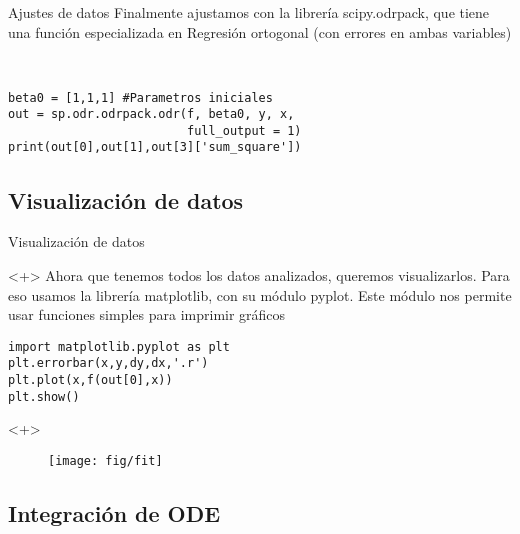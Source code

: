 \documentclass{beamer}
\begin{document}
\begin{frame}[fragile]{Ajustes de datos}
    Finalmente ajustamos con la librería scipy.odrpack, que tiene una función especializada en Regresión ortogonal (con errores en ambas variables)
    \begin{verbatim}


beta0 = [1,1,1] #Parametros iniciales
out = sp.odr.odrpack.odr(f, beta0, y, x, 
                         full_output = 1)
print(out[0],out[1],out[3]['sum_square'])
\end{verbatim}
   
\end{frame}


\subsection{Visualización de datos}

\begin{frame}[fragile]{Visualización de datos}
\begin{onlyenv}<+>
    Ahora que tenemos todos los datos analizados, queremos visualizarlos. Para eso usamos la librería matplotlib, con su módulo pyplot. Este módulo nos permite usar funciones simples para imprimir gráficos
\begin{verbatim}
import matplotlib.pyplot as plt
plt.errorbar(x,y,dy,dx,'.r')
plt.plot(x,f(out[0],x))
plt.show()
\end{verbatim}
\end{onlyenv}
\begin{onlyenv}<+>
  \begin{figure}
  \centering
  \texttt{[image: fig/fit]}
  \label{fig:fit}
  \end{figure}
\end{onlyenv}
\end{frame}

\subsection{Integración de ODE}
\end{document}
